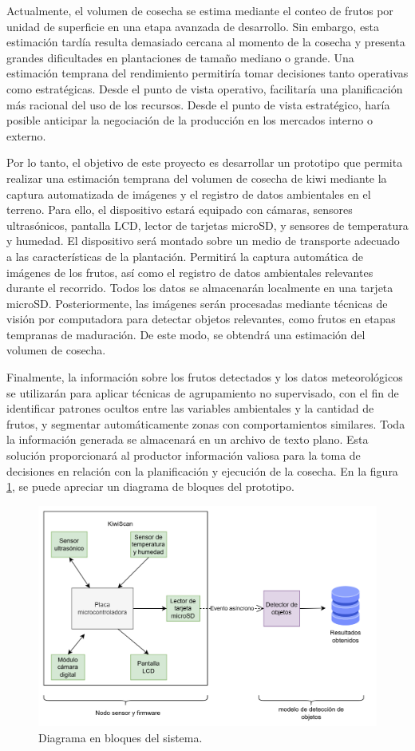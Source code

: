 \documentclass[
11pt, %
]{charter}
\begin{document}
Actualmente, el volumen de cosecha se estima mediante el conteo de frutos por unidad de superficie en una etapa avanzada de desarrollo. Sin embargo, esta estimación tardía resulta demasiado cercana al momento de la cosecha y presenta grandes dificultades en plantaciones de tamaño mediano o grande. Una estimación temprana del rendimiento permitiría tomar decisiones tanto operativas como estratégicas. Desde el punto de vista operativo, facilitaría una planificación más racional del uso de los recursos. Desde el punto de vista estratégico, haría posible anticipar la negociación de la producción en los mercados interno o externo.

Por lo tanto, el objetivo de este proyecto es desarrollar un prototipo que permita realizar una estimación temprana del volumen de cosecha de kiwi mediante la captura automatizada de imágenes y el registro de datos ambientales en el terreno. Para ello, el dispositivo estará equipado con cámaras, sensores ultrasónicos, pantalla LCD, lector de tarjetas microSD, y sensores de temperatura y humedad. El dispositivo será montado sobre un medio de transporte adecuado a las características de la plantación. Permitirá la captura automática de imágenes de los frutos, así como el registro de datos ambientales relevantes durante el recorrido. Todos los datos se almacenarán localmente en una tarjeta microSD. Posteriormente, las imágenes serán procesadas mediante técnicas de visión por computadora para detectar objetos relevantes, como frutos en etapas tempranas de maduración. De este modo, se obtendrá una estimación del volumen de cosecha.

Finalmente, la información sobre los frutos detectados y los datos meteorológicos se utilizarán para aplicar técnicas de agrupamiento no supervisado, con el fin de identificar patrones ocultos entre las variables ambientales y la cantidad de frutos, y segmentar automáticamente zonas con comportamientos similares. Toda la información generada se almacenará en un archivo de texto plano. Esta solución proporcionará al productor información valiosa para la toma de decisiones en relación con la planificación y ejecución de la cosecha. En la figura \ref{fig:diagBloques}, se puede apreciar un diagrama de bloques del prototipo.

\begin{figure}[htpb]
\centering 
\includegraphics[width=.90\textwidth]{./Figuras/KiwiScan.png}
\caption{Diagrama en bloques del sistema.}
\label{fig:diagBloques}
\end{figure}
\end{document}
